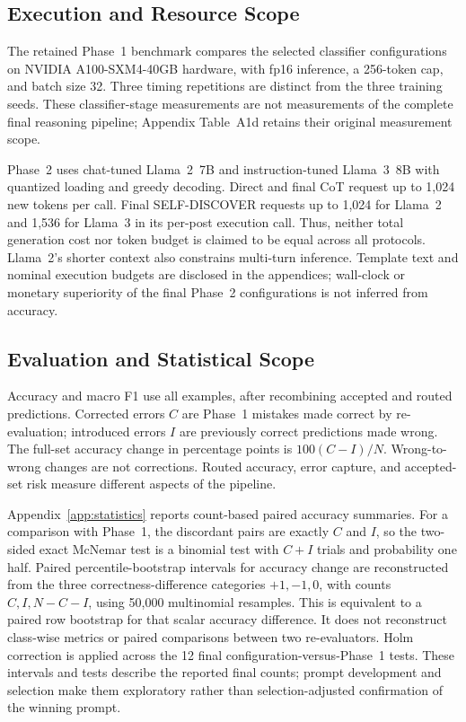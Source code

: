 \documentclass{ieeeaccess}
\begin{document}
\subsection{Execution and Resource Scope}
The retained Phase~1 benchmark compares the selected classifier configurations on NVIDIA A100-SXM4-40GB hardware, with fp16 inference, a 256-token cap, and batch size 32. Three timing repetitions are distinct from the three training seeds. These classifier-stage measurements are not measurements of the complete final reasoning pipeline; Appendix Table~A1d retains their original measurement scope.

Phase~2 uses chat-tuned Llama~2~7B and instruction-tuned Llama~3~8B with quantized loading and greedy decoding. Direct and final CoT request up to 1,024 new tokens per call. Final SELF-DISCOVER requests up to 1,024 for Llama~2 and 1,536 for Llama~3 in its per-post execution call. Thus, neither total generation cost nor token budget is claimed to be equal across all protocols. Llama~2's shorter context also constrains multi-turn inference. Template text and nominal execution budgets are disclosed in the appendices; wall-clock or monetary superiority of the final Phase~2 configurations is not inferred from accuracy.

\subsection{Evaluation and Statistical Scope}
Accuracy and macro F1 use all examples, after recombining accepted and routed predictions. Corrected errors $C$ are Phase~1 mistakes made correct by re-evaluation; introduced errors $I$ are previously correct predictions made wrong. The full-set accuracy change in percentage points is $100(C-I)/N$. Wrong-to-wrong changes are not corrections. Routed accuracy, error capture, and accepted-set risk measure different aspects of the pipeline.

Appendix~\ref{app:statistics} reports count-based paired accuracy summaries. For a comparison with Phase~1, the discordant pairs are exactly $C$ and $I$, so the two-sided exact McNemar test is a binomial test with $C+I$ trials and probability one half. Paired percentile-bootstrap intervals for accuracy change are reconstructed from the three correctness-difference categories $+1,-1,0$, with counts $C,I,N-C-I$, using 50,000 multinomial resamples. This is equivalent to a paired row bootstrap for that scalar accuracy difference. It does not reconstruct class-wise metrics or paired comparisons between two re-evaluators. Holm correction is applied across the 12 final configuration-versus-Phase~1 tests. These intervals and tests describe the reported final counts; prompt development and selection make them exploratory rather than selection-adjusted confirmation of the winning prompt.
\end{document}
